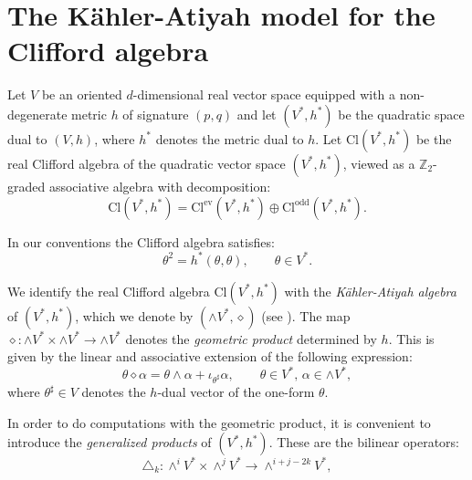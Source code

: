 \documentclass[10pt,a4paper,twoside,reqno]{amsart}
\theoremstyle{plain}
\theoremstyle{definition}
\theoremstyle{remark}
\def\Z{\mathbb{Z}}
\begin{document}


\section{The Kähler-Atiyah model for the Clifford algebra}
\label{app:KA}


Let $V$ be an oriented $d$-dimensional real vector space equipped with a non-degenerate metric $h$ of signature $(p,q)$ and let $(V^*,h^*)$ be the quadratic space dual to $(V,h)$, where $h^*$ denotes the metric dual to $h$. Let $\mathrm{Cl}(V^*,h^*)$ be the real Clifford algebra of the quadratic vector space $(V^*,h^*)$, viewed as a $\Z_2$-graded associative algebra with decomposition: $$\mathrm{Cl}(V^*,h^*)=\mathrm{Cl}^{\mathrm{ev}}(V^*,h^*)\oplus\mathrm{Cl}^{\mathrm{odd}}(V^*,h^*).$$

In our conventions the Clifford algebra satisfies: $$\theta^2=h^*(\theta,\theta),\qquad\theta\in V^*.$$

We identify the real Clifford algebra $\mathrm{Cl}(V^*,h^*)$ with the \emph{Kähler-Atiyah algebra} of $(V^*,h^*)$, which we denote by $(\wedge V^*,\diamond)$ (see \cite{Chev54,Chev55}). The map $\diamond\colon\wedge V^*\times\wedge V^*\to\wedge V^*$ denotes the \emph{geometric product} determined by $h$. This is given by the linear and associative extension of the following expression: \begin{equation}\label{eq:def_geometric_product}
    \theta\diamond\alpha=\theta\wedge\alpha+\iota_{\theta^\sharp}\alpha,\qquad\theta\in V^*,\,\alpha\in\wedge V^*,
\end{equation} where $\theta^\sharp\in V$ denotes the $h$-dual vector of the one-form $\theta$.\medskip

In order to do computations with the geometric product, it is convenient to introduce the \emph{generalized products} of $(V^*,h^*)$. These are the bilinear operators:
\begin{equation}
\label{eq:bilinearDelta}
\triangle_k\colon\wedge^i V^*\times\wedge^j V^*\to\wedge^{i + j - 2k}V^*,
\end{equation}
\end{document}
